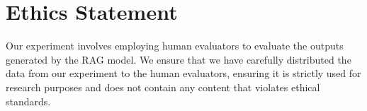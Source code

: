 \section*{Ethics Statement}
Our experiment involves employing human evaluators to evaluate the outputs generated by the RAG model. We ensure that we have carefully distributed the data from our experiment to the human evaluators, ensuring it is strictly used for research purposes and does not contain any content that violates ethical standards.